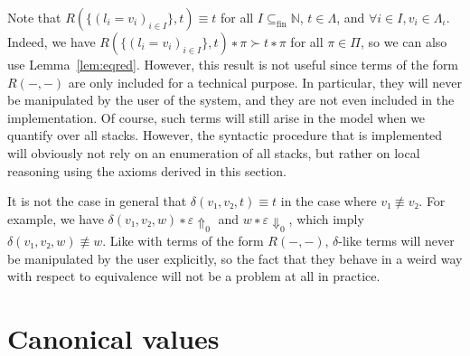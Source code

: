 \begin{remark}
  Note that $R(\{(l_i = v_i)_{i∈I}\},t) ≡ t$ for all $I ⊆_\text{fin}
  \mathbb{N}$, $t ∈ Λ$, and $∀i∈I, v_i ∈ Λ_{ι}$. Indeed, we have
  ${R(\{(l_i = v_i)_{i∈I}\},t) ∗ π} ≻ {t ∗ π}$ for all $π ∈ Π$, so we
  can also use Lemma~\ref{lem:eqred}. However, this result is not
  useful since terms of the form $R({-},{-})$ are only included for a
  technical purpose. In particular, they will never be manipulated by
  the user of the system, and they are not even included in the
  implementation. Of course, such terms will still arise in the
  model when we quantify over all stacks. However, the syntactic procedure
  that is implemented will obviously not rely on an enumeration of all
  stacks, but rather on local reasoning using the axioms derived in this
  section.
\end{remark}
\begin{remark}
  It is not the case in general that $δ(v₁,v₂,t) ≡ t$ in the case where
  $v₁ \not\equiv v₂$. For example, we have ${δ(v₁,v₂,w) ∗ ε} {⇑}_0$ and
  ${w ∗ ε} {⇓}_0$, which imply $δ(v₁,v₂,w) \not\equiv w$. Like with terms
  of the form $R({-},{-})$, $δ$-like terms will never be manipulated by
  the user explicitly, so the fact that they behave in a weird way with
  respect to equivalence will not be a problem at all in practice.
\end{remark}



\section{Canonical values}

